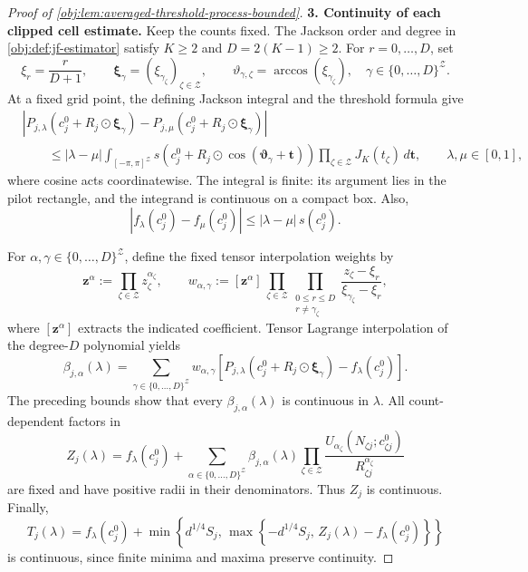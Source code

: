 \begin{proof}[Proof of \cref{obj:lem:averaged-threshold-process-bounded}]
\noindent\textbf{3. Continuity of each clipped cell estimate.}
Keep the counts fixed. The Jackson order and degree in \cref{obj:def:jf-estimator} satisfy \(K\geq2\) and \(D=2(K-1)\geq2\). For \(r=0,\ldots,D\), set
\[
\xi_r=\frac{r}{D+1},
\qquad
\boldsymbol\xi_\gamma=(\xi_{\gamma_\zeta})_{\zeta\in\mathcal Z},
\qquad
\vartheta_{\gamma,\zeta}=\arccos(\xi_{\gamma_\zeta}),
\quad
\gamma\in\{0,\ldots,D\}^{\mathcal Z}.
\]
At a fixed grid point, the defining Jackson integral and the threshold formula give
\[
\begin{aligned}
&\left|
P_{j,\lambda}(c_j^0+R_j\odot\boldsymbol\xi_\gamma)
-P_{j,\mu}(c_j^0+R_j\odot\boldsymbol\xi_\gamma)
\right|\\
&\qquad\leq |\lambda-\mu|
\int_{[-\pi,\pi]^{\mathcal Z}}
s\!\left(c_j^0+R_j\odot
\cos(\boldsymbol\vartheta_\gamma+\boldsymbol t)\right)
\prod_{\zeta\in\mathcal Z}J_K(t_\zeta)\,d\boldsymbol t,
\qquad \lambda,\mu\in[0,1],
\end{aligned}
\]
where cosine acts coordinatewise. The integral is finite: its argument lies in the pilot rectangle, and the integrand is continuous on a compact box. Also,
\[
|f_\lambda(c_j^0)-f_\mu(c_j^0)|
\leq |\lambda-\mu|\,s(c_j^0).
\]

For \(\alpha,\gamma\in\{0,\ldots,D\}^{\mathcal Z}\), define the fixed tensor interpolation weights by
\[
\boldsymbol z^\alpha:=\prod_{\zeta\in\mathcal Z}z_\zeta^{\alpha_\zeta},
\qquad
w_{\alpha,\gamma}:=
[\boldsymbol z^\alpha]\,
\prod_{\zeta\in\mathcal Z}
\prod_{\substack{0\leq r\leq D\\r\ne\gamma_\zeta}}
\frac{z_\zeta-\xi_r}{\xi_{\gamma_\zeta}-\xi_r},
\]
where \([\boldsymbol z^\alpha]\) extracts the indicated coefficient. Tensor Lagrange interpolation of the degree-\(D\) polynomial yields
\[
\beta_{j,\alpha}(\lambda)
=
\sum_{\gamma\in\{0,\ldots,D\}^{\mathcal Z}}
w_{\alpha,\gamma}
\left[
P_{j,\lambda}(c_j^0+R_j\odot\boldsymbol\xi_\gamma)
-f_\lambda(c_j^0)
\right].
\]
The preceding bounds show that every \(\beta_{j,\alpha}(\lambda)\) is continuous in \(\lambda\). All count-dependent factors in
\[
Z_j(\lambda)=f_\lambda(c_j^0)+
\sum_{\alpha\in\{0,\ldots,D\}^{\mathcal Z}}
\beta_{j,\alpha}(\lambda)
\prod_{\zeta\in\mathcal Z}
\frac{U_{\alpha_\zeta}(N_{\zeta j};c^0_{\zeta j})}
     {R_{\zeta j}^{\alpha_\zeta}}
\]
are fixed and have positive radii in their denominators. Thus \(Z_j\) is continuous. Finally,
\[
T_j(\lambda)=f_\lambda(c_j^0)+
\min\!\left\{d^{1/4}S_j,\,
\max\!\left\{-d^{1/4}S_j,\,
Z_j(\lambda)-f_\lambda(c_j^0)\right\}\right\}
\]
is continuous, since finite minima and maxima preserve continuity.


\end{proof}
